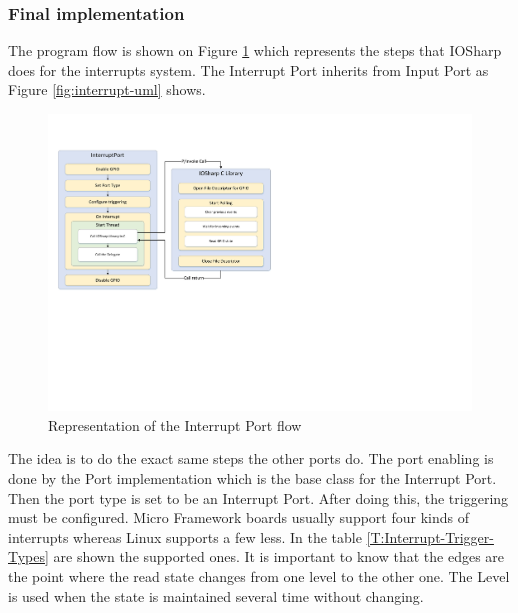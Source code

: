\subsubsection{Final implementation}\label{SSS:IOSharp-Interrupt-Implementation}
The program flow is shown on Figure \ref{fig:interrupt-schema} which represents the steps that IOSharp does for the interrupts system. The Interrupt Port inherits from Input Port as Figure \ref{fig:interrupt-uml} shows.
\begin{figure}[H]\begin{center}
 \centering
  \captionsetup{justification=centering}
  \includegraphics[width=1\textwidth]{pictures/iosharp/interrupt-schema}
  \caption{Representation of the Interrupt Port flow \label{fig:interrupt-schema}}
\end{center}\end{figure}
The idea is to do the exact same steps the other ports do. The port enabling is done by the Port implementation which is the base class for the Interrupt Port. Then the port type is set to be an Interrupt Port. After doing this, the triggering must be configured. Micro Framework boards usually support four kinds of interrupts whereas Linux supports a few less. In the table \ref{T:Interrupt-Trigger-Types} are shown the supported ones. It is important to know that the edges are the point where the read state changes from one level to the other one. The Level is used when the state is maintained several time without changing.


